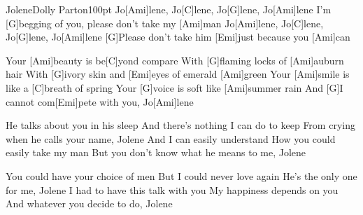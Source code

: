 \begin{song}{Jolene}{Dolly Parton}{100pt}
\chorus%
Jo[Ami]lene, Jo[C]lene, Jo[G]lene, Jo[Ami]lene
I'm [G]begging of you, please don't take my [Ami]man
Jo[Ami]lene, Jo[C]lene, Jo[G]lene, Jo[Ami]lene
[G]Please don't take him [Emi]just because you [Ami]can

%
Your [Ami]beauty is be[C]yond compare
With [G]flaming locks of [Ami]auburn hair
With [G]ivory skin and [Emi]eyes of emerald [Ami]green
Your [Ami]smile is like a [C]breath of spring
Your [G]voice is soft like [Ami]summer rain
And [G]I cannot com[Emi]pete with you, Jo[Ami]lene

%
He talks about you in his sleep
And there's nothing I can do to keep
From crying when he calls your name, Jolene
And I can easily understand
How you could easily take my man
But you don't know what he means to me, Jolene

\chorus

%
You could have your choice of men
But I could never love again
He's the only one for me, Jolene
I had to have this talk with you
My happiness depends on you
And whatever you decide to do, Jolene

\chorus
\end{song}

